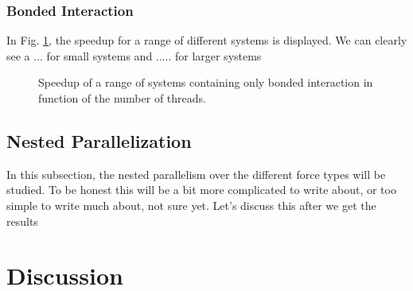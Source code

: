 \documentclass[conference]{IEEEtran}
\begin{document}
        \subsubsection{Bonded Interaction}
        In Fig. \ref{fig:bonded-speedup}, the speedup for a range of different systems is displayed. We can clearly
        see a ... for small systems and ..... for larger systems
        \begin{figure}[H]
            \centering
            \caption{Speedup of a range of systems containing only bonded interaction in function of the number 
            of threads.}\label{fig:bonded-speedup}
        \end{figure}
    
    \subsection{Nested Parallelization}
    In this subsection, the nested parallelism over the different force types will be studied. To be honest this will
    be a bit more complicated to write about, or too simple to write much about, not sure yet. Let's discuss this
    after we get the results

\section{Discussion}





\end{document}
